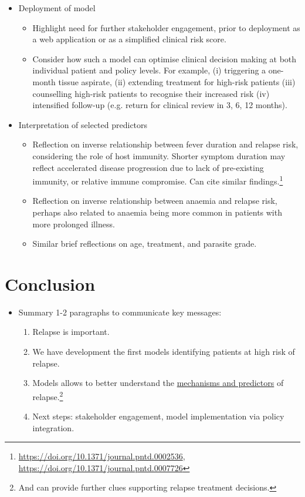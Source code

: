 \documentclass[11pt,a4paper]{article} %
\begin{document}
\begin{itemize}
\begin{enumerate}
        \end{enumerate}
  \item Deployment of model
        \begin{itemize}
          \item Highlight need for further stakeholder engagement, prior to deployment as a web application or as a simplified clinical risk score.
          \item Consider how such a model can optimise clinical decision making at both individual patient and policy levels. For example, (i) triggering a one-month tissue aspirate, (ii) extending treatment for high-risk patients (iii) counselling high-risk patients to recognise their increased risk (iv) intensified follow-up (e.g. return for clinical review in 3, 6, 12 months).
        \end{itemize}
  \item{Interpretation of selected predictors}
        \begin{itemize}
          \item Reflection on inverse relationship between fever duration and relapse risk, considering the role of host immunity. Shorter symptom duration may reflect accelerated disease progression due to lack of pre-existing immunity, or relative immune compromise. Can cite similar findings.\footnote{\url{https://doi.org/10.1371/journal.pntd.0002536}, \url{https://doi.org/10.1371/journal.pntd.0007726}}
          \item Reflection on inverse relationship between anaemia and relapse risk, perhaps also related to anaemia being more common in patients with more prolonged illness.
          \item Similar brief reflections on age, treatment, and parasite grade.
        \end{itemize}
\end{itemize}

\section*{Conclusion}
\begin{itemize}
  \item Summary 1-2 paragraphs to communicate key messages:
        \begin{enumerate}
          \item Relapse is important.
          \item We have development the first models identifying patients at high risk of relapse.
          \item Models allows to better understand the \underline{mechanisms and predictors} of relapse.\footnote{And can provide further clues supporting relapse treatment decisions.}
          \item Next steps: stakeholder engagement, model implementation via policy integration.
        \end{enumerate}
\end{itemize}
\end{document}
